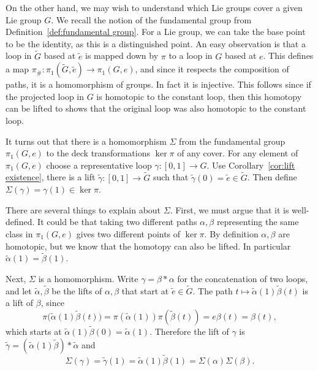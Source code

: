 On the other hand, we may wish to understand which Lie groups cover a given Lie group $G$.
We recall the notion of the fundamental group from Definition~\ref{def:fundamental group}.
For a Lie group, we can take the base point to be the identity, as this is a distinguished point.
An easy observation is that a loop in $\tilde{G}$ based at $\tilde{e}$ is mapped down by $\pi$ to a loop in $G$ based at $e$.
This defines a map $\pi_\# : \pi_1(\tilde{G},\tilde{e}) \to \pi_1(G,e)$, and since it respects the composition of paths, it is a homomorphism of groups.
In fact it is injective.
This follows since if the projected loop in $G$ is homotopic to the constant loop, then this homotopy can be lifted to shows that the original loop was also homotopic to the constant loop.

It turns out that there is a homomorphism $\Sigma$ from the fundamental group $\pi_1(G,e)$ to the deck transformations $\ker \pi$ of any cover.
For any element of $\pi_1(G,e)$ choose a representative loop $\gamma : [0,1] \to G$.
Use Corollary~\ref{cor:lift existence}, there is a lift $\tilde{\gamma} : [0,1] \to \tilde{G}$ such that $\tilde{\gamma}(0) = \tilde{e} \in \tilde{G}$.
Then define $\Sigma(\gamma) = \gamma(1) \in \ker \pi$.

There are several things to explain about $\Sigma$.
First, we must argue that it is well-defined.
It could be that taking two different paths $\alpha,\beta$ representing the same class in $\pi_1(G,e)$ gives two different points of $\ker \pi$.
By definition $\alpha,\beta$ are homotopic, but we know that the homotopy can also be lifted.
In particular $\tilde{\alpha}(1) = \tilde{\beta}(1)$.


Next, $\Sigma$ is a homomorphism.
Write $\gamma = \beta \ast \alpha$ for the concatenation of two loops, and let $\tilde{\alpha},\tilde{\beta}$ be the lifts of $\alpha,\beta$ that start at $\tilde{e} \in \tilde{G}$.
The path $t \mapsto \tilde{\alpha}(1) \tilde{\beta}(t)$ is a lift of $\beta$, since 
\[
\pi\Big(\tilde{\alpha}(1) \tilde{\beta}(t)\Big)
= \pi(\tilde{\alpha}(1)) \pi(\tilde{\beta}(t))
= e \beta(t)
= \beta(t),
\]
which starts at $\tilde{\alpha}(1) \tilde{\beta}(0) = \tilde{\alpha}(1)$.
Therefore the lift of $\gamma$ is $\tilde{\gamma} = (\tilde{\alpha}(1) \tilde{\beta}) \ast \tilde{\alpha}$ and 
\[
\Sigma(\gamma) 
= \tilde{\gamma}(1) 
= \tilde{\alpha}(1) \tilde{\beta}(1)
= \Sigma(\alpha)\Sigma(\beta).
\]

